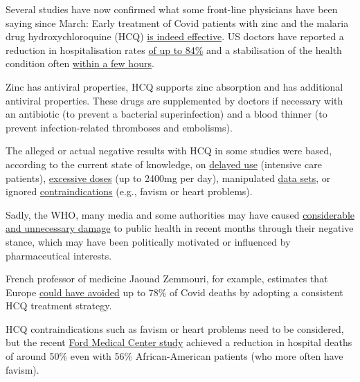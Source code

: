Several studies have now confirmed what some front-line physicians have
been saying since March: Early treatment of Covid patients with zinc and
the malaria drug hydroxychloroquine (HCQ)
\href{https://swprs.org/on-the-treatment-of-covid-19/}{is indeed
effective}. US doctors have reported a reduction in hospitalisation
rates \href{https://www.preprints.org/manuscript/202007.0025/v1}{of up
to 84\%} and a stabilisation of the health condition often
\href{https://www.youtube.com/watch?v=eVs_EWVCVPc}{within a few hours}.

Zinc has antiviral properties, HCQ supports zinc absorption and has
additional antiviral properties. These drugs are supplemented by doctors
if necessary with an antibiotic (to prevent a bacterial superinfection)
and a blood thinner (to prevent infection-related thromboses and
embolisms).

The alleged or actual negative results with HCQ in some studies were
based, according to the current state of knowledge, on
\href{https://c19study.com/}{delayed use} (intensive care patients),
\href{http://www.francesoir.fr/politique-monde/oxford-recovery-et-solidarity-overdosage-two-clinical-trials-acts-considered}{excessive
doses} (up to 2400mg per day), manipulated
\href{https://www.theguardian.com/world/2020/jun/03/covid-19-surgisphere-who-world-health-organization-hydroxychloroquine}{data
sets}, or ignored
\href{https://www.iss.it/en/rapporti-covid-19/-/asset_publisher/btw1J82wtYzH/content/id/5334891}{contraindications}
(e.g., favism or heart problems).

Sadly, the WHO, many media and some authorities may have caused
\href{https://www.youtube.com/watch?v=UIDsKdeFOmQ}{considerable and
unnecessary damage} to public health in recent months through their
negative stance, which may have been politically motivated or influenced
by pharmaceutical interests.

French professor of medicine Jaouad Zemmouri, for example, estimates
that Europe
\href{https://www.moroccoworldnews.com/2020/06/306587/moroccan-scientist-moroccos-chloroquine-success-reveals-european-failures/}{could
have avoided} up to 78\% of Covid deaths by adopting a consistent HCQ
treatment strategy.

HCQ contraindications such as favism or heart problems need to be
considered, but the recent
\href{https://www.henryford.com/news/2020/07/hydro-treatment-study}{Ford
Medical Center study} achieved a reduction in hospital deaths of around
50\% even with 56\% African-American patients (who more often have
favism).

